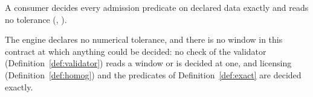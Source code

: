 
A consumer decides every admission predicate on declared data exactly and
reads no tolerance (,
).

\begin{requirement}\label{req:no-window}
The engine declares no numerical tolerance, and there is no window in this
contract at which anything could be decided: no check of the validator
(Definition~\ref{def:validator}) reads a window or is decided at one, and
licensing (Definition~\ref{def:homog}) and the predicates of
Definition~\ref{def:exact} are decided exactly.
\end{requirement}
